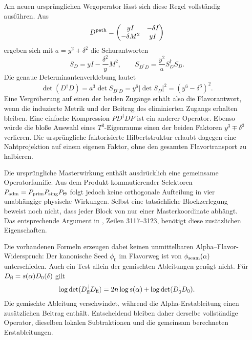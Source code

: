Am neuen ursprünglichen Wegoperator lässt sich diese Regel vollständig ausführen. Aus
\begin{equation}
D^{\rm path}=\begin{pmatrix}yI&-\delta I\\-\delta M^2&yI\end{pmatrix}
\end{equation}
ergeben sich mit $a=y^2+\delta^2$ die Schurantworten
\begin{equation}
S_D=yI-\frac{\delta^2}{y}M^2,\qquad
S_{D^\dagger D}=\frac{y^2}{a}S_D^\dagger S_D.
\end{equation}
Die genaue Determinantenverklebung lautet
\begin{equation}
\boxed{\det(D^\dagger D)=a^3\det S_{D^\dagger D}
=y^6|\det S_D|^2=(y^6-\delta^6)^2.}
\end{equation}
Eine Vergröberung auf einen der beiden Zugänge erhält also die Flavorantwort, wenn die induzierte Metrik und der Beitrag des eliminierten Zugangs erhalten bleiben. Eine einfache Kompression $P D^\dagger DP$ ist ein anderer Operator. Ebenso würde die bloße Auswahl eines $T^3$-Eigenraums einen der beiden Faktoren $y^3\mp\delta^3$ verlieren. Die ursprüngliche faktorisierte Hilbertstruktur erlaubt dagegen eine Nahtprojektion auf einem eigenen Faktor, ohne den gesamten Flavortransport zu halbieren.

Die ursprüngliche Masterwirkung enthält ausdrücklich eine gemeinsame Operatorfamilie. Aus dem Produkt kommutierender Selektoren $P_{\rm adm}=P_{\rm prim}P_{\rm sing}P_\Theta$ folgt jedoch keine orthogonale Aufteilung in vier unabhängige physische Wirkungen. Selbst eine tatsächliche Blockzerlegung beweist noch nicht, dass jeder Block von nur einer Masterkoordinate abhängt. Das entsprechende Argument in , Zeilen 3117--3123, benötigt diese zusätzlichen Eigenschaften.

Die vorhandenen Formeln erzeugen dabei keinen unmittelbaren Alpha--Flavor-Widerspruch: Der kanonische Seed $\phi_0$ im Flavorweg ist von $\phi_{\rm seam}(\alpha)$ unterschieden. Auch ein Test allein der gemischten Ableitungen genügt nicht. Für $D_{\rm fl}=s(\alpha)D_0(\delta)$ gilt
\begin{equation}
\log\det(D_{\rm fl}^\dagger D_{\rm fl})
=2n\log s(\alpha)+\log\det(D_0^\dagger D_0).
\end{equation}
Die gemischte Ableitung verschwindet, während die Alpha-Erstableitung einen zusätzlichen Beitrag enthält. Entscheidend bleiben daher derselbe vollständige Operator, dieselben lokalen Subtraktionen und die gemeinsam berechneten Erstableitungen.

